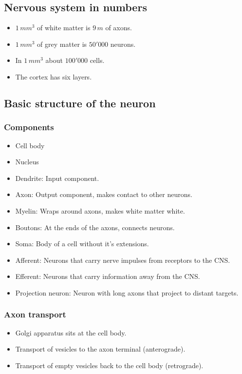 \documentclass[a4paper, 12pt]{article}
\begin{document}
\subsection{Nervous system in numbers}
\begin{itemize}[noitemsep,nolistsep]
	\item $1\,mm^3$ of white matter is $9\,m$ of axons.
	\item $1\,mm^3$ of grey matter is $50'000$ neurons.
	\item In $1\,mm^3$ about $100'000$ cells.
	\item The cortex has six layers.
\end{itemize}

\subsection{Basic structure of the neuron}
\subsubsection{Components}
\begin{itemize}[noitemsep,nolistsep]
	\item Cell body
	\item Nucleus
	\item Dendrite: Input component.
	\item Axon: Output component, makes contact to other neurons.
	\item Myelin: Wraps around axons, makes white matter white.
	\item Boutons: At the ends of the axons, connects neurons.
	\item Soma: Body of a cell without it's extensions.
	\item Afferent: Neurons that carry nerve impulses from receptors to the CNS.
	\item Efferent: Neurons that carry information away from the CNS.
	\item Projection neuron: Neuron with long axons that project to distant targets.
\end{itemize}
\subsubsection{Axon transport}
\begin{itemize}[noitemsep,nolistsep]
	\item Golgi apparatus sits at the cell body.
	\item Transport of vesicles to the axon terminal (anterograde).
	\item Transport of empty vesicles back to the cell body (retrograde).
\end{itemize}
\end{document}
